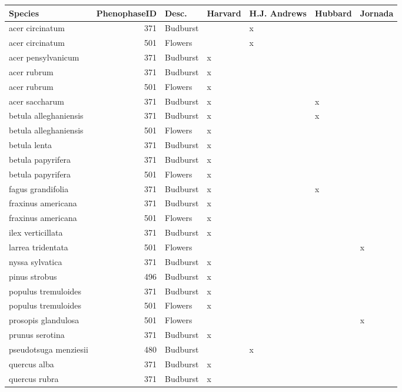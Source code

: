 \documentclass[a4paper,12pt]{article}
\begin{document}
\begin{table}
\footnotesize
\begin{tabular}{l|r|l|l|l|l|l}
\hline
Species & PhenophaseID & Desc. & Harvard & H.J. Andrews & Hubbard & Jornada\\
\hline
acer circinatum & 371 & Budburst &  & x &  & \\
\hline
acer circinatum & 501 & Flowers &  & x &  & \\
\hline
acer pensylvanicum & 371 & Budburst & x &  &  & \\
\hline
acer rubrum & 371 & Budburst & x &  &  & \\
\hline
acer rubrum & 501 & Flowers & x &  &  & \\
\hline
acer saccharum & 371 & Budburst & x &  & x & \\
\hline
betula alleghaniensis & 371 & Budburst & x &  & x & \\
\hline
betula alleghaniensis & 501 & Flowers & x &  &  & \\
\hline
betula lenta & 371 & Budburst & x &  &  & \\
\hline
betula papyrifera & 371 & Budburst & x &  &  & \\
\hline
betula papyrifera & 501 & Flowers & x &  &  & \\
\hline
fagus grandifolia & 371 & Budburst & x &  & x & \\
\hline
fraxinus americana & 371 & Budburst & x &  &  & \\
\hline
fraxinus americana & 501 & Flowers & x &  &  & \\
\hline
ilex verticillata & 371 & Budburst & x &  &  & \\
\hline
larrea tridentata & 501 & Flowers &  &  &  & x\\
\hline
nyssa sylvatica & 371 & Budburst & x &  &  & \\
\hline
pinus strobus & 496 & Budburst & x &  &  & \\
\hline
populus tremuloides & 371 & Budburst & x &  &  & \\
\hline
populus tremuloides & 501 & Flowers & x &  &  & \\
\hline
prosopis glandulosa & 501 & Flowers &  &  &  & x\\
\hline
prunus serotina & 371 & Budburst & x &  &  & \\
\hline
pseudotsuga menziesii & 480 & Budburst &  & x &  & \\
\hline
quercus alba & 371 & Budburst & x &  &  & \\
\hline
quercus rubra & 371 & Budburst & x &  &  & \\

\end{tabular}
\end{table}
\end{document}
